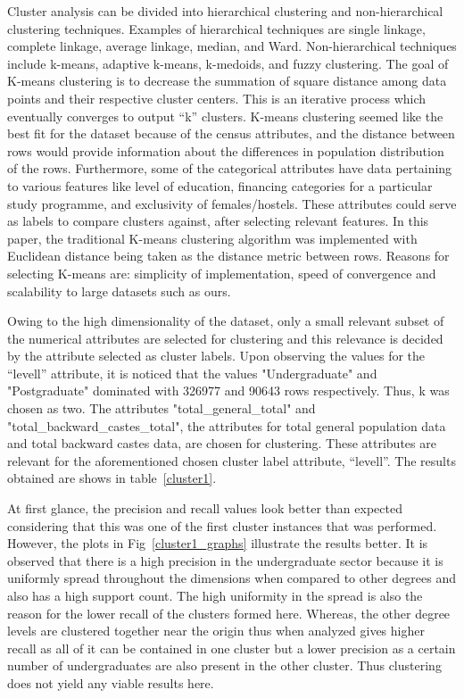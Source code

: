 Cluster analysis can be divided into hierarchical clustering and non-hierarchical clustering techniques. Examples of hierarchical techniques are single linkage, complete linkage, average linkage, median, and Ward. Non-hierarchical techniques include k-means, adaptive k-means, k-medoids, and fuzzy clustering. The goal of K-means clustering is to decrease the summation of square distance among data points and their respective cluster centers. This is an iterative process which eventually converges to output “k” clusters. K-means clustering seemed like the best fit for the dataset because of the census attributes, and the distance between rows would provide information about the differences in population distribution of the rows. Furthermore, some of the categorical attributes have data pertaining to various features like level of education, financing categories for a particular study programme, and exclusivity of females/hostels. These attributes could serve as labels to compare clusters against, after selecting relevant features. In this paper, the traditional K-means clustering algorithm was implemented with Euclidean distance being taken as the distance metric between rows. Reasons for selecting K-means are: simplicity of implementation, speed of convergence and scalability to large datasets such as ours.

Owing to the high dimensionality of the dataset, only a small relevant subset of the numerical attributes are selected for clustering and this relevance is decided by the attribute selected as cluster labels. Upon observing the values for the ``levell'' attribute, it is noticed that the values "Undergraduate" and "Postgraduate" dominated with 326977 and 90643 rows respectively. Thus, k was chosen as two. The attributes "total\_general\_total" and "total\_backward\_castes\_total", the attributes for total general population data and total backward castes data, are chosen for clustering. These attributes are relevant for the aforementioned chosen cluster label attribute, ``levell''. The results obtained are shows in table~\ref{cluster1}. 

At first glance, the precision and recall values look better than expected considering that this was one of the first cluster instances that was performed. However, the plots in Fig~\ref{cluster1_graphs} illustrate the results better. 
It is observed that there is a high precision in the undergraduate sector because it is uniformly spread throughout the dimensions when compared to other degrees and also has a high support count. The high uniformity in the spread is also the reason for the lower recall of the clusters formed here. Whereas, the other degree levels are clustered together near the origin thus when analyzed gives higher recall as all of it can be contained in one cluster but a lower precision as a certain number of undergraduates are also present in the other cluster. Thus clustering does not yield any viable results here.


